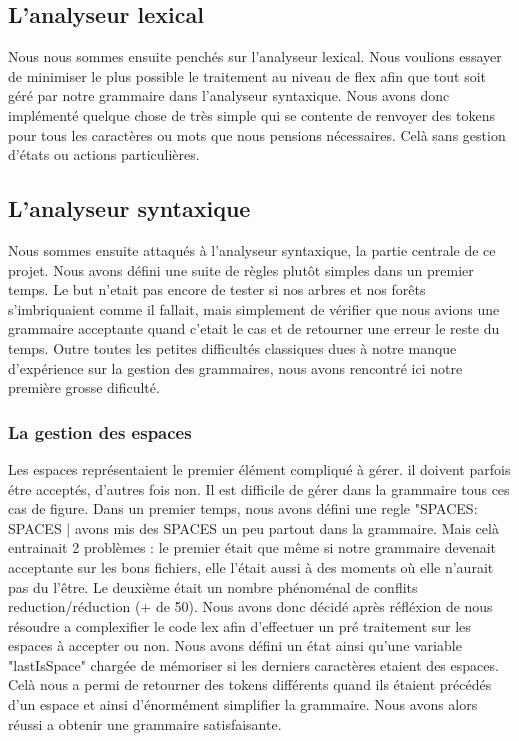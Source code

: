 \documentclass[12pt]{article}
\begin{document}
\subsection{L'analyseur lexical}

Nous nous sommes ensuite penchés sur l'analyseur lexical. Nous voulions essayer de
minimiser le plus possible le traitement au niveau de flex afin que tout soit géré
par notre grammaire dans l'analyseur syntaxique. Nous avons donc implémenté
quelque chose de très simple qui se contente de renvoyer des tokens pour tous les
caractères ou mots que nous pensions nécessaires. Celà sans gestion d'états ou actions
particulières.

\subsection{L'analyseur syntaxique}

Nous sommes ensuite attaqués à l'analyseur syntaxique, la partie centrale de ce projet.
Nous avons défini une suite de règles plutôt simples dans un premier temps. Le but
n'etait pas encore de tester si nos arbres et nos forêts s'imbriquaient comme il fallait,
mais simplement de vérifier que nous avions une grammaire acceptante quand c'etait
le cas et de retourner une erreur le reste du temps.
\newline
Outre toutes les petites difficultés classiques dues à notre manque d'expérience
sur la gestion des grammaires, nous avons rencontré ici notre première
grosse dificulté.

\subsubsection{La gestion des espaces}

Les espaces représentaient le premier élément compliqué à gérer. il doivent parfois étre acceptés,
d'autres fois non. Il est difficile de gérer dans la grammaire tous ces cas de figure.
Dans un premier temps, nous avons défini une regle "SPACES: SPACES | %
avons mis des SPACES un peu partout dans la grammaire. Mais celà entrainait 2 problèmes :
le premier était que même si notre grammaire devenait acceptante sur les bons fichiers,
elle l'était aussi à des moments où elle n'aurait pas du l'être. Le deuxième était un
nombre phénoménal de conflits reduction/réduction (+ de 50).
\newline
Nous avons donc décidé après réfléxion de nous résoudre a complexifier le code lex
afin d'effectuer un pré traitement sur les espaces à accepter ou non.
Nous avons défini un état ainsi qu'une variable "lastIsSpace" chargée de mémoriser
si les derniers caractères etaient des espaces. Celà nous a permi de retourner des tokens
différents quand ils étaient précédés d'un espace et ainsi d'énormément simplifier la grammaire.
Nous avons alors réussi a obtenir une grammaire satisfaisante.
\end{document}
